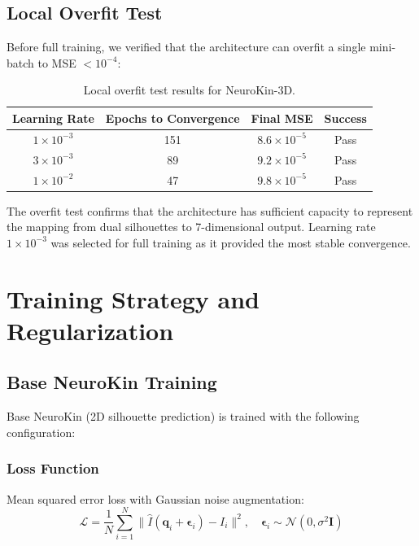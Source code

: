 \documentclass[12pt,a4paper,oneside]{report}
\begin{document}
\subsection{Local Overfit Test}

Before full training, we verified that the architecture can overfit a single mini-batch to MSE $< 10^{-4}$:

\begin{table}[H]
\centering
\caption{Local overfit test results for NeuroKin-3D.}
\label{tab:overfit_test}
\begin{tabular}{cccc}
\toprule
Learning Rate & Epochs to Convergence & Final MSE & Success \\
\midrule
$1 \times 10^{-3}$ & 151 & $8.6 \times 10^{-5}$ & Pass \\
$3 \times 10^{-3}$ & 89 & $9.2 \times 10^{-5}$ & Pass \\
$1 \times 10^{-2}$ & 47 & $9.8 \times 10^{-5}$ & Pass \\
\bottomrule
\end{tabular}
\end{table}

The overfit test confirms that the architecture has sufficient capacity to represent the mapping from dual silhouettes to 7-dimensional output. Learning rate $1 \times 10^{-3}$ was selected for full training as it provided the most stable convergence.

\section{Training Strategy and Regularization}

\subsection{Base NeuroKin Training}

Base NeuroKin (2D silhouette prediction) is trained with the following configuration:

\subsubsection{Loss Function}

Mean squared error loss with Gaussian noise augmentation:
\begin{equation}
\mathcal{L} = \frac{1}{N} \sum_{i=1}^{N} \|\hat{I}(\mathbf{q}_i + \boldsymbol{\epsilon}_i) - I_i\|^2, \quad \boldsymbol{\epsilon}_i \sim \mathcal{N}(0, \sigma^2 \mathbf{I})
\end{equation}
\end{document}
